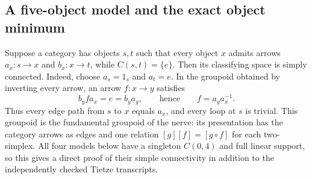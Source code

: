 \subsection{A five-object model and the exact object minimum}


\begin{remark*}
Suppose a category has objects $s,t$ such that every object $x$ admits
arrows $a_x:s\to x$ and $b_x:x\to t$, while $C(s,t)=\{e\}$.
Then its classifying space is simply connected. Indeed, choose
$a_s=1_s$ and $a_t=e$. In the groupoid obtained by inverting every
arrow, an arrow $f:x\to y$ satisfies
\[
 b_y f a_x=e=b_y a_y,
 \qquad\text{hence}\qquad f=a_y a_x^{-1}.
\]
Thus every edge path from $s$ to $x$ equals $a_x$, and every loop
at $s$ is trivial. This groupoid is the fundamental groupoid of
the nerve: its presentation has the category arrows as edges and
one relation $[g][f]=[g\circ f]$ for each two-simplex. All four
models below have a singleton $C(0,4)$ and full linear support,
so this gives a direct proof of their simple connectivity in
addition to the independently checked Tietze transcripts.
\end{remark*}

